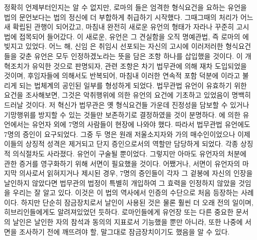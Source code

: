 정확히 언제부터인지는 알 수 없지만,
로마의 들은
엄격한 형식요건을 요하는 유언을
법의 문언보다는 법의 정신에 더 부합하게
취급하기 시작했다.
그때그때의 처리가 어느새 확립된 관행이 되어갔고,
마침내 완전히 새로운 유언의 형태가 자라나
꾸준히 고시법에 접목되어 들어갔다.
이 새로운,  유언은 그 견실함을
오직 명예관법, 즉 로마의 에
빚지고 있었다.
어느 해, 신임 은 취임시 선포되는 자신의 고시에
이러저러한 형식요건들을 갖춘 유언은 모두 인정하겠노라는 뜻을 담은
조항 하나를 삽입했을 것이다.
이 개혁조치가 유익한 것으로 판명되자, 관련 조항은
차기 법무관에 의해 재차 도입되었을 것이며,
후임자들에 의해서도 반복되어, 마침내
이러한 연속적 포함 덕분에 이라고 불리게 되는
법체계의 공인된 일부를 형성하게 되었다.
법무관법 유언이 유효하기 위한 요건을 조사해보면,
그것은 악취행위에 의한 유언의 요건에 기초하고 있었음이 명백히 드러날 것이다.
저 혁신가 법무관은 옛 형식요건들 가운데 진정성을 담보할 수 있거나
기망행위를 방지할 수 있는 것들만 보존하기로 결정하였을 것이 분명하다.
에 의한 유언에서는 유언자 외에 7명의 사람들이 현장에 나와야 했다.
따라서 법무관법 유언에도 7명의 증인이 요구되었다.
그중 두 명은 원래 저울소지자와
가의 매수인이었으나 이제 이들의 상징적 성격은
제거되고 단지 증인으로서의 역할만 담당하게 되었다.
각종 상징적 의식절차도 사라졌다.
유언이 구술될 뿐이었다. 그렇지만 아마도
유언자의 처분에 관한 증거를 영구화하기 위해 서면이 필요했을 것이다.
어쨌거나, 서면이 유언자의 마지막 의사로서 읽혀지거나 제시된 경우,
7명의 증인들이 각자 그 겉봉에 자신의 인장을 날인하지 않았다면
법무관의 법정이
특별히 개입하여
그 효력을 인정하지 않았을 것임을 우리는 잘 알고 있다.
이것은
이
법의 역사에서
인증의 수단으로
처음 등장하는 사례이다.
하지만
단순히 잠금장치로서 날인이 사용된 것은 물론 훨씬 더 오래 전의 일이며,
히브리인들에게도 알려져있었던 듯하다.
로마인들에게 유언장 또는 다른 중요한 문서의 날인은
날인한 자의 참석과 동의의 지표로서 기능했을 뿐만 아니라,
또한
나중에 서면을 조사하기 전에 깨뜨려야 할, 말그대로 잠금장치이기도 했음을
알 수 있다.


